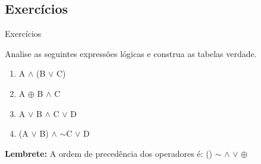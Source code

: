 \subsection{Exercícios}

\begin{frame}{Exercícios}

	Analise as seguintes expressões lógicas e construa as tabelas verdade.

	\vspace{1cm}

	\begin{enumerate}
		\item A $\wedge$ (B $\vee$ C)
		\item A $\oplus$ B $\wedge$ C
		\item A $\vee$ B $\wedge$ C $\vee$ D
		\item (A $\vee$ B) $\wedge$ $\sim$C $\vee$ D
	\end{enumerate}			

	\vspace{1cm}
	\textbf{Lembrete:}
		A ordem de precedência dos operadores é:
()
$\sim$
$\wedge$
$\vee$
$\oplus$

\end{frame}






%
